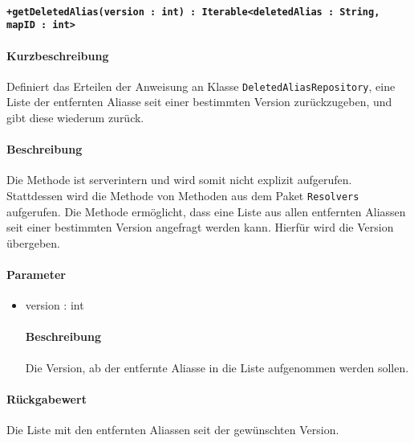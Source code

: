 \paragraph*{\texttt{+getDeletedAlias(version : int) : Iterable<deletedAlias : String, mapID : int>}}%
\paragraph*{Kurzbeschreibung}
Definiert das Erteilen der Anweisung an Klasse \texttt{DeletedAliasRepository}, eine Liste der entfernten Aliasse seit einer bestimmten Version zurückzugeben, und gibt diese wiederum zurück.
\paragraph*{Beschreibung}
Die Methode ist serverintern und wird somit nicht explizit aufgerufen.
Stattdessen wird die Methode von Methoden aus dem Paket \texttt{Resolvers} aufgerufen.
Die Methode ermöglicht, dass eine Liste aus allen entfernten Aliassen seit einer bestimmten Version angefragt werden kann.
Hierfür wird die Version übergeben.
\paragraph*{Parameter}
\begin{itemize}
    \item version : int
    		\paragraph*{Beschreibung}
    		Die Version, ab der entfernte Aliasse in die Liste aufgenommen werden sollen.
\end{itemize}
\paragraph*{Rückgabewert}
Die Liste mit den entfernten Aliassen seit der gewünschten Version.

